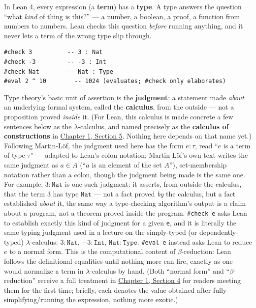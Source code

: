 In Lean 4, every expression (a \textbf{term}) has a \textbf{type}. A type answers the question ``what \emph{kind} of thing is this?'' --- a number, a boolean, a proof, a function from numbers to numbers. Lean checks this question \emph{before} running anything, and it never lets a term of the wrong type slip through.

\begin{lstlisting}
#check 3          -- 3 : Nat
#check -3         -- -3 : Int
#check Nat        -- Nat : Type
#eval 2 ^ 10        -- 1024 (evaluates; #check only elaborates)
\end{lstlisting}

\begin{mathreading}

Type theory's basic unit of assertion is the \textbf{judgment}: a statement made \emph{about} an underlying formal system, called the \textbf{calculus}, from the outside --- not a proposition proved \emph{inside} it. (For Lean, this calculus is made concrete a few sentences below as the \(\lambda\)-calculus, and named precisely as the \textbf{calculus of constructions} in \hyperref[sec:01-basics:05-pi-sigma-and-coc:1]{Chapter 1, Section 5}. Nothing here depends on that name yet.) Following Martin-Löf, the judgment used here has the form \(e : \tau\), read ``\(e\) is a term of type \(\tau\)'' --- adapted to Lean's colon notation; Martin-Löf's own text writes the same judgment as \(a \in A\) (``\(a\) is an element of the set \(A\)''), set-membership notation rather than a colon, though the judgment being made is the same one. For example, \(3 : \mathtt{Nat}\) is one such judgment: it asserts, from outside the calculus, that the term \(3\) has type \(\mathtt{Nat}\) --- not a fact proved \emph{by} the calculus, but a fact established \emph{about} it, the same way a type-checking algorithm's output is a claim about a program, not a theorem proved inside the program. \texttt{\#check e} asks Lean to establish exactly this kind of judgment for a given \texttt{e}, and it is literally the same typing judgment used in a lecture on the simply-typed (or dependently-typed) \(\lambda\)-calculus: \(3 : \mathtt{Nat}\), \({-3} : \mathtt{Int}\), \(\mathtt{Nat} : \mathtt{Type}\). \texttt{\#eval e} instead asks Lean to reduce \(e\) to a normal form. This is the computational content of \(\beta\)-reduction: Lean follows the definitional equalities until nothing more can fire, exactly as one would normalize a term in \(\lambda\)-calculus by hand. (Both ``normal form'' and ``\(\beta\)-reduction'' receive a full treatment in \hyperref[sec:01-basics:04-terminology:1]{Chapter 1, Section 4} for readers meeting them for the first time; briefly, each denotes the value obtained after fully simplifying/running the expression, nothing more exotic.)

\end{mathreading}

